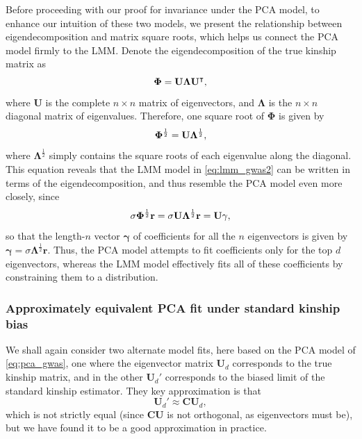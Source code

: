 \documentclass[11pt]{article}
\newcommand{\kinMat}{%
  \ensuremath{%
    \mathbf{\Phi}
  }%
  \xspace%
}%
\begin{document}
Before proceeding with our proof for invariance under the PCA model, to enhance our intuition of these two models, we present the relationship between eigendecomposition and matrix square roots, which helps us connect the PCA model firmly to the LMM.
Denote the eigendecomposition of the true kinship matrix as
$$
\kinMat = \mathbf{U} \mathbf{\Lambda} \mathbf{U}^\intercal,
$$
where $\mathbf{U}$ is the complete $n \times n$ matrix of eigenvectors, and
$\mathbf{\Lambda}$ is the $n \times n$ diagonal matrix of eigenvalues.
Therefore, one square root of \kinMat is given by
$$
\kinMat^\frac{1}{2}
=
\mathbf{U} \mathbf{\Lambda}^\frac{1}{2}
,
$$
where $\mathbf{\Lambda}^\frac{1}{2}$ simply contains the square roots of each eigenvalue along the diagonal.
This equation reveals that the LMM model in \cref{eq:lmm_gwas2} can be written in terms of the eigendecomposition, and thus resemble the PCA model even more closely, since
$$
\sigma \kinMat^\frac{1}{2} \mathbf{r}
=
\sigma \mathbf{U} \mathbf{\Lambda}^\frac{1}{2} \mathbf{r}
=
\mathbf{U} \mathbf{\gamma}
,
$$
so that the length-$n$ vector $\mathbf{\gamma}$ of coefficients for all the $n$ eigenvectors is given by
$
\mathbf{\gamma} = \sigma \mathbf{\Lambda}^\frac{1}{2} \mathbf{r}
$.
Thus, the PCA model attempts to fit coefficients only for the top $d$ eigenvectors, whereas the LMM model effectively fits all of these coefficients by constraining them to a distribution.

\subsubsection{Approximately equivalent PCA fit under standard kinship bias}

We shall again consider two alternate model fits, here based on the PCA model of \cref{eq:pca_gwas}, one where the eigenvector matrix $\mathbf{U}_d$ corresponds to the true kinship matrix, and in the other $\mathbf{U}_d'$ corresponds to the biased limit of the standard kinship estimator.
They key approximation is that
$$
\mathbf{U}_d' \approx \mathbf{C} \mathbf{U}_d,
$$
which is not strictly equal (since $\mathbf{C} \mathbf{U}$ is not orthogonal, as eigenvectors must be), but we have found it to be a good approximation in practice.
\end{document}
